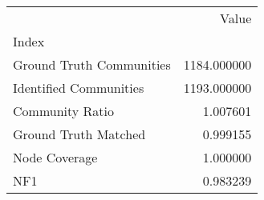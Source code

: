 \begin{tabular}{lr}
\toprule
{} &        Value \\
Index                    &              \\
\midrule
Ground Truth Communities &  1184.000000 \\
Identified Communities   &  1193.000000 \\
Community Ratio          &     1.007601 \\
Ground Truth Matched     &     0.999155 \\
Node Coverage            &     1.000000 \\
NF1                      &     0.983239 \\
\bottomrule
\end{tabular}
